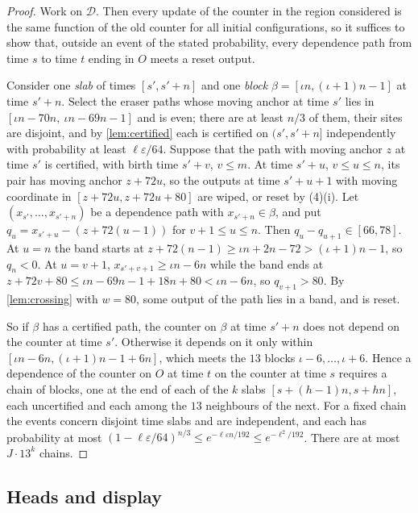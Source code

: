 \documentclass[11pt]{article}
\theoremstyle{plain}
\theoremstyle{definition}
\theoremstyle{remark}
\newcommand{\eps}{\varepsilon}
\begin{document}
\begin{proof}
Work on $\mathcal D$. Then every update of the counter in the region considered is the same function of the old counter for all initial configurations, so it suffices to show that, outside an event of the stated probability, every dependence path from time $s$ to time $t$ ending in $O$ meets a reset output.

Consider one \emph{slab} of times $[s',s'+n]$ and one \emph{block} $\beta=[\iota n,(\iota+1)n-1]$ at time $s'+n$. Select the eraser paths whose moving anchor at time $s'$ lies in $[\iota n-70n,\ \iota n-69n-1]$ and is even; there are at least $n/3$ of them, their sites are disjoint, and by \cref{lem:certified} each is certified on $(s',s'+n]$ independently with probability at least $\ell\eps/64$. Suppose that the path with moving anchor $z$ at time $s'$ is certified, with birth time $s'+v$, $v\le m$. At time $s'+u$, $v\le u\le n$, its pair has moving anchor $z+72u$, so the outputs at time $s'+u+1$ with moving coordinate in $[z+72u,z+72u+80]$ are wiped, or reset by (4)(i). Let $(x_{s'},\dots,x_{s'+n})$ be a dependence path with $x_{s'+n}\in\beta$, and put $q_u=x_{s'+u}-(z+72(u-1))$ for $v+1\le u\le n$. Then $q_u-q_{u+1}\in[66,78]$. At $u=n$ the band starts at $z+72(n-1)\ge\iota n+2n-72>(\iota+1)n-1$, so $q_n<0$. At $u=v+1$, $x_{s'+v+1}\ge\iota n-6n$ while the band ends at $z+72v+80\le\iota n-69n-1+18n+80<\iota n-6n$, so $q_{v+1}>80$. By \cref{lem:crossing} with $w=80$, some output of the path lies in a band, and is reset.

So if $\beta$ has a certified path, the counter on $\beta$ at time $s'+n$ does not depend on the counter at time $s'$. Otherwise it depends on it only within $[\iota n-6n,(\iota+1)n-1+6n]$, which meets the $13$ blocks $\iota-6,\dots,\iota+6$. Hence a dependence of the counter on $O$ at time $t$ on the counter at time $s$ requires a chain of blocks, one at the end of each of the $k$ slabs $[s+(h-1)n,s+hn]$, each uncertified and each among the $13$ neighbours of the next. For a fixed chain the events concern disjoint time slabs and are independent, and each has probability at most $(1-\ell\eps/64)^{n/3}\le e^{-\ell\eps n/192}\le e^{-\ell^2/192}$. There are at most $J\cdot13^k$ chains.
\end{proof}

\subsection{Heads and display}
\end{document}

